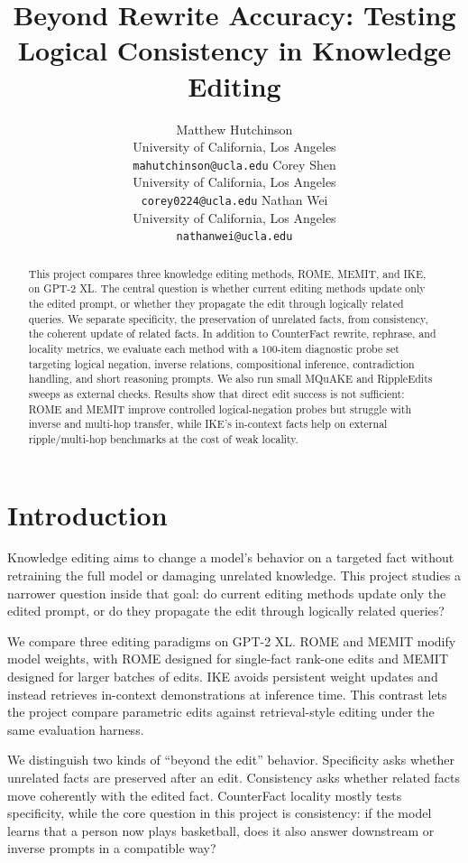 \documentclass[11pt]{article}
\title{Beyond Rewrite Accuracy: Testing Logical Consistency in Knowledge Editing}
\author{
  Matthew Hutchinson \\
  University of California, Los Angeles \\
  \texttt{mahutchinson@ucla.edu}
  \And
  Corey Shen \\
  University of California, Los Angeles \\
  \texttt{corey0224@ucla.edu}
  \And
  Nathan Wei \\
  University of California, Los Angeles \\
  \texttt{nathanwei@ucla.edu}
}
\begin{document}
\maketitle

\begin{abstract}
This project compares three knowledge editing methods, ROME, MEMIT, and IKE, on GPT-2 XL. The central question is whether current editing methods update only the edited prompt, or whether they propagate the edit through logically related queries. We separate specificity, the preservation of unrelated facts, from consistency, the coherent update of related facts. In addition to CounterFact rewrite, rephrase, and locality metrics, we evaluate each method with a 100-item diagnostic probe set targeting logical negation, inverse relations, compositional inference, contradiction handling, and short reasoning prompts. We also run small MQuAKE and RippleEdits sweeps as external checks. Results show that direct edit success is not sufficient: ROME and MEMIT improve controlled logical-negation probes but struggle with inverse and multi-hop transfer, while IKE's in-context facts help on external ripple/multi-hop benchmarks at the cost of weak locality.
\end{abstract}

\section{Introduction}

Knowledge editing aims to change a model's behavior on a targeted fact without retraining the full model or damaging unrelated knowledge. This project studies a narrower question inside that goal: do current editing methods update only the edited prompt, or do they propagate the edit through logically related queries?

We compare three editing paradigms on GPT-2 XL. ROME and MEMIT modify model weights, with ROME designed for single-fact rank-one edits and MEMIT designed for larger batches of edits. IKE avoids persistent weight updates and instead retrieves in-context demonstrations at inference time. This contrast lets the project compare parametric edits against retrieval-style editing under the same evaluation harness.

We distinguish two kinds of ``beyond the edit'' behavior. Specificity asks whether unrelated facts are preserved after an edit. Consistency asks whether related facts move coherently with the edited fact. CounterFact locality mostly tests specificity, while the core question in this project is consistency: if the model learns that a person now plays basketball, does it also answer downstream or inverse prompts in a compatible way?
\end{document}
